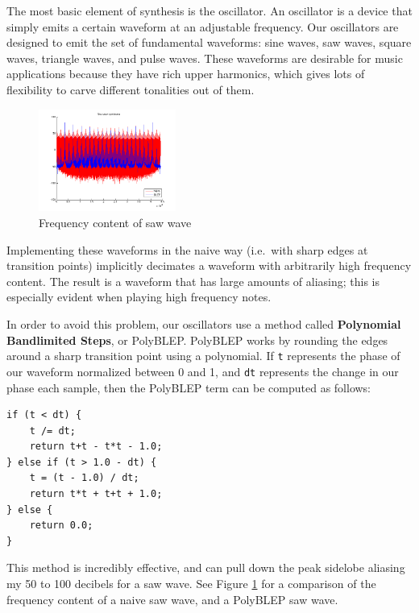 \documentclass[letterpaper,12pt]{article}
\begin{document}
The most basic element of synthesis is the oscillator. An oscillator is a device that simply emits a certain waveform at an adjustable frequency. Our oscillators are designed to emit the set of fundamental waveforms: sine waves, saw waves, square waves, triangle waves, and pulse waves. These waveforms are desirable for music applications because they have rich upper harmonics, which gives lots of flexibility to carve different tonalities out of them.

\begin{figure}
\centering
\includegraphics[width=0.4\textwidth]{figures/blep-spectrum.png}
\caption{Frequency content of saw wave}
\label{fig:polyblep-spectrum}
\end{figure}

Implementing these waveforms in the naive way (i.e.\ with sharp edges at transition points) implicitly decimates a waveform with arbitrarily high frequency content. The result is a waveform that has large amounts of aliasing; this is especially evident when playing high frequency notes.


In order to avoid this problem, our oscillators use a method called \textbf{Polynomial Bandlimited Steps}, or PolyBLEP\cite{polyblep}. PolyBLEP works by rounding the edges around a sharp transition point using a polynomial. If \texttt{t} represents the phase of our waveform normalized between 0 and 1, and \texttt{dt} represents the change in our phase each sample, then the PolyBLEP term can be computed as follows:

\begin{verbatim}
if (t < dt) {
    t /= dt;
    return t+t - t*t - 1.0;
} else if (t > 1.0 - dt) {
    t = (t - 1.0) / dt;
    return t*t + t+t + 1.0;
} else {
    return 0.0;
}
\end{verbatim}

This method is incredibly effective, and can pull down the peak sidelobe aliasing my 50 to 100 decibels for a saw wave. See Figure \ref{fig:polyblep-spectrum} for a comparison of the frequency content of a naive saw wave, and a PolyBLEP saw wave.
\end{document}
